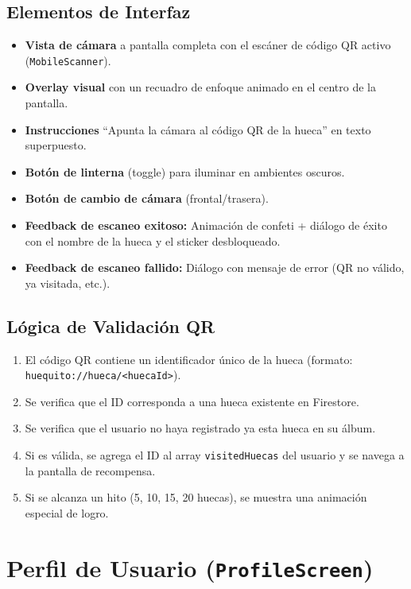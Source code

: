\documentclass[11pt, a4paper, oneside]{report}
\begin{document}
\subsection{Elementos de Interfaz}
\begin{itemize}
  \item \textbf{Vista de cámara} a pantalla completa con el escáner de código QR activo (\texttt{MobileScanner}).
  \item \textbf{Overlay visual} con un recuadro de enfoque animado en el centro de la pantalla.
  \item \textbf{Instrucciones} ``Apunta la cámara al código QR de la hueca'' en texto superpuesto.
  \item \textbf{Botón de linterna} (toggle) para iluminar en ambientes oscuros.
  \item \textbf{Botón de cambio de cámara} (frontal/trasera).
  \item \textbf{Feedback de escaneo exitoso:} Animación de confeti + diálogo de éxito con el nombre de la hueca y el sticker desbloqueado.
  \item \textbf{Feedback de escaneo fallido:} Diálogo con mensaje de error (QR no válido, ya visitada, etc.).
\end{itemize}

\subsection{Lógica de Validación QR}
\begin{enumerate}
  \item El código QR contiene un identificador único de la hueca (formato: \texttt{huequito://hueca/<huecaId>}).
  \item Se verifica que el ID corresponda a una hueca existente en Firestore.
  \item Se verifica que el usuario no haya registrado ya esta hueca en su álbum.
  \item Si es válida, se agrega el ID al array \texttt{visitedHuecas} del usuario y se navega a la pantalla de recompensa.
  \item Si se alcanza un hito (5, 10, 15, 20 huecas), se muestra una animación especial de logro.
\end{enumerate}

\section{Perfil de Usuario (\texttt{ProfileScreen})}
\end{document}

